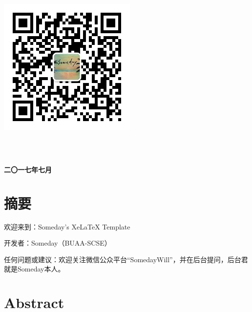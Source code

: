 \documentclass{ctexart}
\newcommand{\sanhao}{\fontsize{15.75pt}{0}}
\newcommand{\xiaosi}{\fontsize{12pt}{0}}
\begin{document}
\begin{center}
\includegraphics[scale=0.5]{SomedayWill_QR_code.jpg}
\end{center}

\ \\
\ \\ 
\sanhao
\centerline{\textbf{二〇一七年七月}}



\renewcommand{\headrulewidth}{0pt}%
\clearpage
{} %

\xiaosi
\section*{摘要}

欢迎来到：Someday's XeLaTeX Template\par
开发者：Someday（BUAA-SCSE）\par
任何问题或建议：欢迎关注微信公众平台“SomedayWill”，并在后台提问，后台君就是Someday本人。\par

\section*{Abstract}
\end{document}
